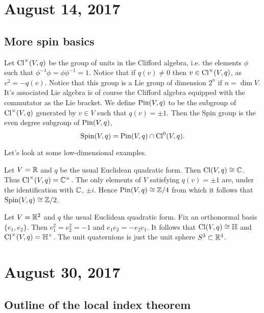 \documentclass{amsart}
\begin{document}
\section{August 14, 2017}

\subsection{More spin basics}

Let $\operatorname{Cl}^\times(V,q)$ be the group of units in the Clifford algebra, i.e. the elements
$\phi$ such that $\phi^{-1}\phi=\phi\phi^{-1}=1$. Notice that if $q(v)\neq 0$ then
$v\in\operatorname{Cl}^\times(V,q)$, as $v^2=-q(v)$. Notice that this group is a Lie group of dimension
$2^n$ if $n=\dim V$. It's associated Lie algebra is of course the Clifford algebra
equipped with the commutator as the Lie bracket. We define $\operatorname{Pin}(V,q)$ to be the subgroup
of $\operatorname{Cl}^\times(V,q)$ generated by $v\in V$ such that $q(v)=\pm 1$. Then the Spin group is
the even degree subgroup of $\operatorname{Pin}(V,q)$,
\begin{equation*}
    \operatorname{Spin}(V,q) = \operatorname{Pin}(V,q) \cap \operatorname{Cl}^0(V,q).
\end{equation*}

Let's look at some low-dimensional examples.
\begin{example}
    Let $V=\mathbb{R}$ and $q$ be the usual Euclidean quadratic form. Then $\operatorname{Cl}(V,q)\cong\mathbb{C}$.
    Thus $\operatorname{Cl}^\times(V,q)=\mathbb{C}^\times$. The only elements of $V$ satisfying $q(v)=\pm 1$
    are, under the identification with $\mathbb{C}$, $\pm i$. Hence $\operatorname{Pin}(V,q)\cong \mathbb{Z}/4$ from
    which it follows that $\operatorname{Spin}(V,q)\cong\mathbb{Z}/2$.
\end{example}

\begin{example}
    Let $V=\mathbb{R}^2$ and $q$ the usual Euclidean quadratic form. Fix an orthonormal basis
    $\{e_1,e_2\}$. Then $e_1^2=e_2^2=-1$ and $e_1e_2=-e_2e_1$. It follows that
    $\operatorname{Cl}(V,q)\cong\mathbb{H}$ and $\operatorname{Cl}^\times(V,q)=\mathbb{H}^\times$. The unit
    quaternions is just the unit sphere $S^3\subset\mathbb{R}^4$.
\end{example}

\section{August 30, 2017}

\subsection{Outline of the local index theorem}
\end{document}

